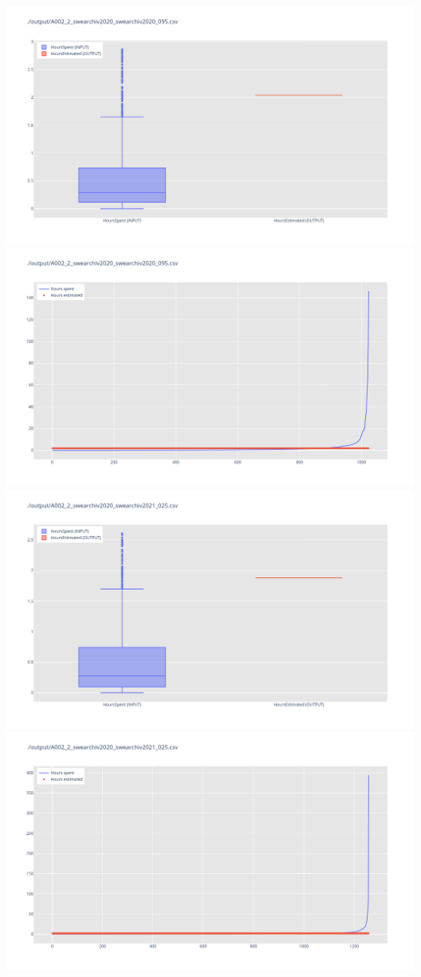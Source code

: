 \includegraphics[width=\textwidth]{Scripts/output/A002_2_swearchiv2020_swearchiv2020_095.csv.png}
\includegraphics[width=\textwidth]{Scripts/output/A002_2_swearchiv2020_swearchiv2020_095.csv.scatter.png}
\includegraphics[width=\textwidth]{Scripts/output/A002_2_swearchiv2020_swearchiv2021_025.csv.png}
\includegraphics[width=\textwidth]{Scripts/output/A002_2_swearchiv2020_swearchiv2021_025.csv.scatter.png}
